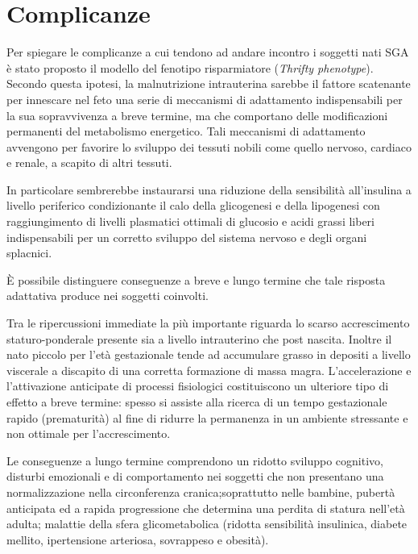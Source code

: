   

\section{Complicanze}


Per spiegare le complicanze a cui tendono ad andare incontro i soggetti nati SGA è stato proposto il modello del fenotipo risparmiatore (\textit{Thrifty phenotype}).
Secondo questa ipotesi, la malnutrizione intrauterina sarebbe il fattore scatenante
per innescare nel feto una serie di meccanismi di adattamento indispensabili per 
la sua sopravvivenza a breve termine, ma che comportano delle modificazioni permanenti
del metabolismo energetico.
Tali meccanismi di adattamento avvengono per favorire lo sviluppo dei tessuti 
nobili come quello nervoso, cardiaco e renale, a scapito di altri tessuti.

In particolare sembrerebbe instaurarsi una riduzione della sensibilità all'insulina
a livello periferico condizionante il calo della glicogenesi e della lipogenesi
con raggiungimento di livelli plasmatici ottimali di glucosio e acidi grassi liberi
indispensabili per un corretto sviluppo del sistema nervoso e degli organi splacnici.\cite{sga-51}



\`E possibile distinguere conseguenze a breve e lungo termine che tale risposta
adattativa produce nei soggetti coinvolti.

Tra le ripercussioni immediate la più importante riguarda lo scarso accrescimento
staturo-ponderale presente sia a livello intrauterino che post nascita. Inoltre 
il nato piccolo per l'età gestazionale tende ad accumulare grasso in depositi a livello
viscerale a discapito di una corretta formazione di massa magra. L'accelerazione e 
l'attivazione anticipate di processi fisiologici costituiscono un ulteriore tipo di 
effetto a breve termine: spesso si assiste alla ricerca di un tempo gestazionale
rapido (prematurità) al fine di ridurre la permanenza in un ambiente stressante
e non ottimale per l'accrescimento.\cite{sga-53}

Le conseguenze a lungo termine comprendono un ridotto sviluppo cognitivo, disturbi emozionali e di comportamento nei 
soggetti che non presentano una normalizzazione nella circonferenza cranica;soprattutto nelle bambine, pubertà 
anticipata ed a rapida progressione  che determina una perdita di 
statura nell'età adulta; malattie della sfera glicometabolica (ridotta sensibilità insulinica, diabete mellito,
ipertensione arteriosa, sovrappeso e obesità).\cite{sga-32}


